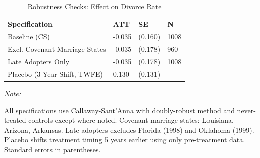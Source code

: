 \begin{table}[!h]
\centering
\caption{\label{tab:robustness}Robustness Checks: Effect on Divorce Rate}
\centering
\begin{threeparttable}
\begin{tabular}[t]{llll}
\toprule
Specification & ATT & SE & N\\
\midrule
Baseline (CS) & -0.035 & (0.160) & 1008\\
Excl. Covenant Marriage States & -0.035 & (0.178) & 960\\
Late Adopters Only & -0.035 & (0.178) & 1008\\
Placebo (3-Year Shift, TWFE) & 0.130 & (0.131) & ---\\
\bottomrule
\end{tabular}
\begin{tablenotes}
\item \textit{Note: } 
\item All specifications use Callaway-Sant'Anna with doubly-robust method and never-treated controls except where noted. Covenant marriage states: Louisiana, Arizona, Arkansas. Late adopters excludes Florida (1998) and Oklahoma (1999). Placebo shifts treatment timing 5 years earlier using only pre-treatment data. Standard errors in parentheses.
\end{tablenotes}
\end{threeparttable}
\end{table}
